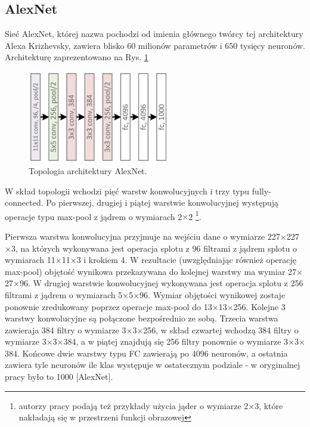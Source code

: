 \subsection{AlexNet}
\label{AlexNet}
Sieć AlexNet, której nazwa pochodzi od imienia głównego twórcy tej architektury Alexa Krizhevsky, zawiera blisko 60 milionów parametrów i 650 tysięcy neuronów. Architekturę zaprezentowano na Rys. \ref{AlexNetTopology}
\begin{figure}[h!]
	\centering
	\includegraphics[width=0.55\textwidth]{figures/AlexNet.png}
	\caption{Topologia architektury AlexNet.}
	\label{AlexNetTopology}
\end{figure}

W skład topologii wchodzi pięć warstw konwolucyjnych i trzy typu fully-connected. Po pierwszej, drugiej i piątej warstwie konwolucyjnej występują operacje typu max-pool z jądrem o wymiarach 2$\times$2 \footnote{autorzy pracy podają też przykłady użycia jąder o wymiarze 2$\times$3, które nakładają się w przestrzeni funkcji obrazowej}. 

Pierwsza warstwa konwolucyjna przyjmuje na wejściu dane o wymiarze 227$\times$227$\times$3, na których wykonywana jest operacja splotu z 96 filtrami z jądrem splotu o wymiarach 11$\times$11$\times$3 i krokiem 4. W rezultacie (uwzględniając również operację max-pool) objętość wynikowa przekazywana do kolejnej warstwy ma wymiar 27$\times$27$\times$96. W drugiej warstwie konwolucyjnej wykonywana jest operacja splotu z 256 filtrami z jądrem o wymiarach 5$\times$5$\times$96. Wymiar objętości wynikowej zostaje ponownie zredukowany poprzez operacje max-pool do 13$\times$13$\times$256. Kolejne 3 warstwy konwolucyjne są połączone bezpośrednio ze sobą. Trzecia warstwa zawieraja 384 filtry o wymiarze 3$\times$3$\times$256, w skład czwartej wchodzą 384 filtry o wymiarze 3$\times$3$\times$384, a w piątej znajdują się 256 filtry ponownie o wymiarze 3$\times$3$\times$384. Końcowe dwie warstwy typu FC zawierają po 4096 neuronów, a ostatnia zawiera tyle neuronów ile klas występuje w ostatecznym podziale - w oryginalnej pracy było to 1000 [AlexNet].


